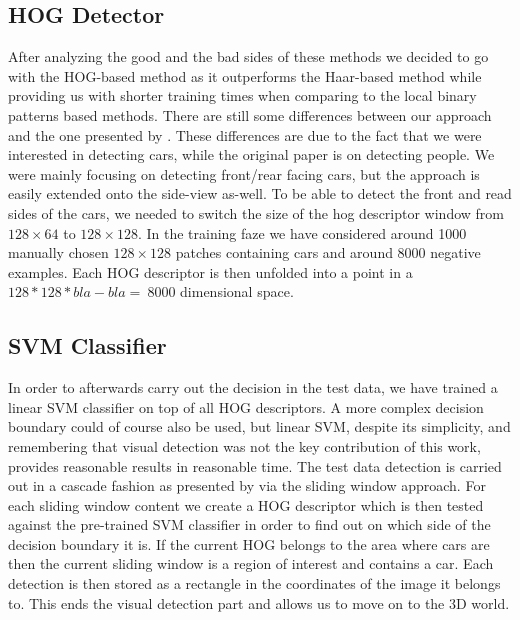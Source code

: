     \subsection{HOG Detector} %
    \label{sub:hog_detector}
        After analyzing the good and the bad sides of these methods we decided to go with the HOG-based method as it outperforms the Haar-based method while providing us with shorter training times when comparing to the local binary patterns based methods.
        There are still some differences between our approach and the one presented by \cite{dalal2005}. These differences are due to the fact that we were interested in detecting cars, while the original paper is on detecting people.
        We were mainly focusing on detecting front/rear facing cars, but the approach is easily extended onto the side-view as-well.
        To be able to detect the front and read sides of the cars, we needed to switch the size of the hog descriptor window from $128 \times 64$ to $128 \times 128$.
        In the training faze we have considered around 1000 manually chosen $128 \times 128$ patches containing cars and around 8000 negative examples. Each HOG descriptor is then unfolded into a point in a $128 * 128 * bla-bla = ~8000$  dimensional space.

    \subsection{SVM Classifier} %
    \label{sub:svm_classifier}
        In order to afterwards carry out the decision in the test data, we have trained a linear SVM classifier on top of all HOG descriptors.
        A more complex decision boundary could of course also be used, but linear SVM, despite its simplicity, and remembering that visual detection was not the key contribution of this work, provides reasonable results in reasonable time.
        The test data detection is carried out in a cascade fashion as presented by \cite{violajones2001} via the sliding window approach. For each sliding window content we create a HOG descriptor which is then tested against the pre-trained SVM classifier in order to find out on which side of the decision boundary it is. If the current HOG belongs to the area where cars are then the current sliding window is a region of interest and contains a car.
        Each detection is then stored as a rectangle in the coordinates of the image it belongs to.
        This ends the visual detection part and allows us to move on to the 3D world.

